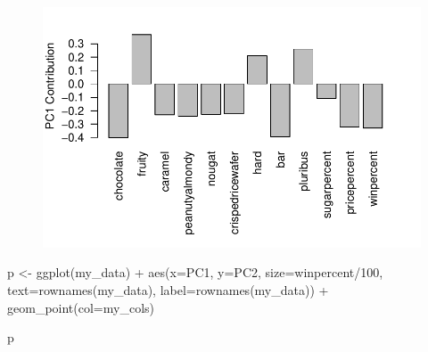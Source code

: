 \documentclass[
  letterpaper,
  DIV=11,
  numbers=noendperiod]{scrartcl}
\newenvironment{Shaded}{\begin{snugshade}}{\end{snugshade}}
\newcommand{\AttributeTok}[1]{\textcolor[rgb]{0.40,0.45,0.13}{#1}}
\newcommand{\DecValTok}[1]{\textcolor[rgb]{0.68,0.00,0.00}{#1}}
\newcommand{\FunctionTok}[1]{\textcolor[rgb]{0.28,0.35,0.67}{#1}}
\newcommand{\NormalTok}[1]{\textcolor[rgb]{0.00,0.23,0.31}{#1}}
\newcommand{\OtherTok}[1]{\textcolor[rgb]{0.00,0.23,0.31}{#1}}
\newcommand{\SpecialCharTok}[1]{\textcolor[rgb]{0.37,0.37,0.37}{#1}}
\newcommand{\StringTok}[1]{\textcolor[rgb]{0.13,0.47,0.30}{#1}}
\begin{document}
\begin{Shaded}
\end{Shaded}

\begin{figure}[H]

{\centering \includegraphics{class09_files/figure-pdf/unnamed-chunk-28-1.pdf}

}

\end{figure}

\begin{Shaded}
\end{Shaded}

\begin{Shaded}
\begin{Highlighting}[]
\NormalTok{p }\OtherTok{\textless{}{-}} \FunctionTok{ggplot}\NormalTok{(my\_data) }\SpecialCharTok{+} 
        \FunctionTok{aes}\NormalTok{(}\AttributeTok{x=}\NormalTok{PC1, }\AttributeTok{y=}\NormalTok{PC2, }
            \AttributeTok{size=}\NormalTok{winpercent}\SpecialCharTok{/}\DecValTok{100}\NormalTok{,  }
            \AttributeTok{text=}\FunctionTok{rownames}\NormalTok{(my\_data),}
            \AttributeTok{label=}\FunctionTok{rownames}\NormalTok{(my\_data)) }\SpecialCharTok{+}
        \FunctionTok{geom\_point}\NormalTok{(}\AttributeTok{col=}\NormalTok{my\_cols)}

\NormalTok{p}
\end{Highlighting}
\end{Shaded}
\end{document}
